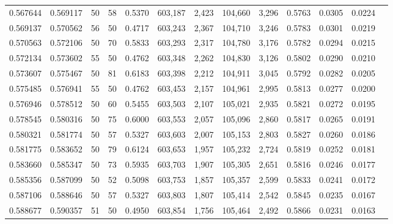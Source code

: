 \begin{tabular}{rrrrrrrrrrrrr}
0.567644 & 0.569117 &    50 &  58 &                                     0.5370 & 603,187 &   2,423 & 104,660 &   3,296 & 0.5763 & 0.0305 & 0.0224 \\
0.569137 & 0.570562 &    56 &  50 &                                     0.4717 & 603,243 &   2,367 & 104,710 &   3,246 & 0.5783 & 0.0301 & 0.0219 \\
0.570563 & 0.572106 &    50 &  70 &                                     0.5833 & 603,293 &   2,317 & 104,780 &   3,176 & 0.5782 & 0.0294 & 0.0215 \\
0.572134 & 0.573602 &    55 &  50 &                                     0.4762 & 603,348 &   2,262 & 104,830 &   3,126 & 0.5802 & 0.0290 & 0.0210 \\
0.573607 & 0.575467 &    50 &  81 &                                     0.6183 & 603,398 &   2,212 & 104,911 &   3,045 & 0.5792 & 0.0282 & 0.0205 \\
0.575485 & 0.576941 &    55 &  50 &                                     0.4762 & 603,453 &   2,157 & 104,961 &   2,995 & 0.5813 & 0.0277 & 0.0200 \\
0.576946 & 0.578512 &    50 &  60 &                                     0.5455 & 603,503 &   2,107 & 105,021 &   2,935 & 0.5821 & 0.0272 & 0.0195 \\
0.578545 & 0.580316 &    50 &  75 &                                     0.6000 & 603,553 &   2,057 & 105,096 &   2,860 & 0.5817 & 0.0265 & 0.0191 \\
0.580321 & 0.581774 &    50 &  57 &                                     0.5327 & 603,603 &   2,007 & 105,153 &   2,803 & 0.5827 & 0.0260 & 0.0186 \\
0.581775 & 0.583652 &    50 &  79 &                                     0.6124 & 603,653 &   1,957 & 105,232 &   2,724 & 0.5819 & 0.0252 & 0.0181 \\
0.583660 & 0.585347 &    50 &  73 &                                     0.5935 & 603,703 &   1,907 & 105,305 &   2,651 & 0.5816 & 0.0246 & 0.0177 \\
0.585356 & 0.587099 &    50 &  52 &                                     0.5098 & 603,753 &   1,857 & 105,357 &   2,599 & 0.5833 & 0.0241 & 0.0172 \\
0.587106 & 0.588646 &    50 &  57 &                                     0.5327 & 603,803 &   1,807 & 105,414 &   2,542 & 0.5845 & 0.0235 & 0.0167 \\
0.588677 & 0.590357 &    51 &  50 &                                     0.4950 & 603,854 &   1,756 & 105,464 &   2,492 & 0.5866 & 0.0231 & 0.0163 \\

\end{tabular}
